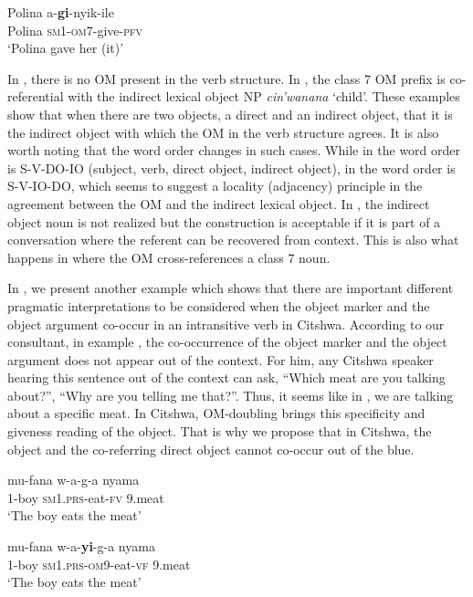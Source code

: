 \documentclass[output=paper]{langscibook}
\begin{document}
    \ex\label{ex:ngunga:31d} \gll  Polina    a-\textbf{gi}{}-nyik-ile    \\
  Polina    {\textsc{sm1}-\textsc{om}7}{}-give-{\textsc{pfv}}      \\
\glt ‘Polina gave her (it)’
    \z
\z

In , there is no OM present in the verb structure. In , the class 7 OM prefix is co-referential with the indirect lexical object NP \textit{cin’wanana} ‘child’. These examples show that when there are two objects, a direct and an indirect object, that it is the indirect object with which the OM in the verb structure agrees. It is also worth noting that the word order changes in such cases. While in  the word order is S-V-DO-IO (subject, verb, direct object, indirect object), in  the word order is S-V-IO-DO, which seems to suggest a locality (adjacency) principle in the agreement between the OM and the indirect lexical object. In , the indirect object noun is not realized but the construction is acceptable if it is part of a conversation where the referent can be recovered from context. This is also what happens in  where the OM cross-references a class 7 noun. 

In , we present another example which shows that there are important different pragmatic interpretations to be considered when the object marker and the object argument co-occur in an intransitive verb in Citshwa. According to our consultant, in example , the co-occurrence of the object marker and the object argument does not appear out of the context. For him, any Citshwa speaker hearing this sentence out of the context can ask, “Which meat are you talking about?”, “Why are you telling me that?”. Thus, it seems like in , we are talking about a specific meat. In Citshwa, OM-doubling brings this specificity and giveness reading of the object. That is why we propose that in Citshwa, the object and the co-referring direct object cannot co-occur out of the blue. 

\ea\label{ex:ngunga:32}
\ea\label{ex:ngunga:32a} \gll   mu-fana   w-a-g-a      nyama\\
1-boy    {\textsc{sm1}.\textsc{prs}}{}-eat-\textsc{fv}  9.meat  \\
\glt ‘The boy eats the meat’

\ex\label{ex:ngunga:32b} \gll  mu-fana   w-a-\textbf{yi}{}-g-a    nyama\\
1-boy    {\textsc{sm1}.\textsc{prs}}{}-{\textsc{om}9}{}-eat-\textsc{vf}  9.meat  \\
\glt ‘The boy eats the meat’
    \z
\z
\end{document}
